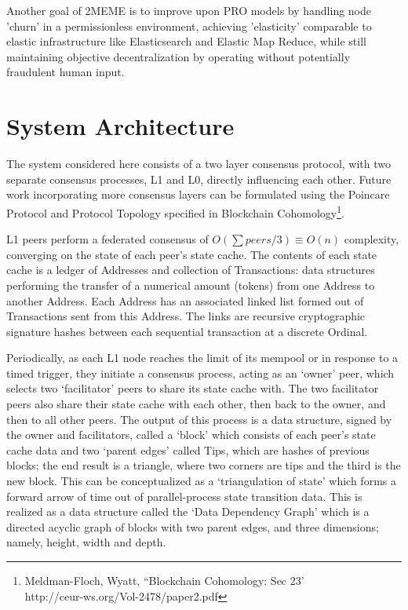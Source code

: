 \documentclass{article}
\theoremstyle{definition}
\theoremstyle{remark}
\theoremstyle{plain}
\begin{document}
Another goal of 2MEME is to improve upon PRO models by handling node 'churn' in a permissionless environment, achieving 'elasticity' comparable to elastic infrastructure like Elasticsearch and Elastic Map Reduce, while still maintaining objective decentralization by operating without potentially fraudulent human input.

\section{System Architecture}
The system considered here consists of a two layer consensus protocol, with two separate consensus processes, L1 and L0, directly influencing each other. Future work incorporating more consensus layers can be formulated using the Poincare Protocol and Protocol Topology specified in Blockchain Cohomology\footnote{Meldman-Floch, Wyatt, ``Blockchain Cohomology: Sec 23' \\ http://ceur-ws.org/Vol-2478/paper2.pdf}.

L1 peers perform a federated consensus of $O(\sum peers/3) \equiv O(n)$ complexity, converging on the state of each peer’s state cache. The contents of each state cache is a ledger of Addresses and collection of Transactions: data structures performing the transfer of a numerical amount (tokens) from one Address to another Address. Each Address has an associated linked list formed out of Transactions sent from this Address. The links are recursive cryptographic signature hashes between each sequential transaction at a discrete Ordinal.

Periodically, as each L1 node reaches the limit of its mempool or in response to a timed trigger, they initiate a consensus process, acting as an ‘owner’ peer, which selects two ‘facilitator’ peers to share its state cache with. The two facilitator peers also share their state cache with each other, then back to the owner, and then to all other peers. The output of this process is a data structure, signed by the owner and facilitators, called a ‘block’ which consists of each peer’s state cache data and two ‘parent edges’ called Tips, which are hashes of previous blocks; the end result is a triangle, where two corners are tips and the third is the new block. This can be conceptualized as a ‘triangulation of state’ which forms a forward arrow of time out of parallel-process state transition data. This is realized as a data structure called the ‘Data Dependency Graph’ which is a directed acyclic graph of blocks with two parent edges, and three dimensions; namely, height, width and depth. 
\end{document}
